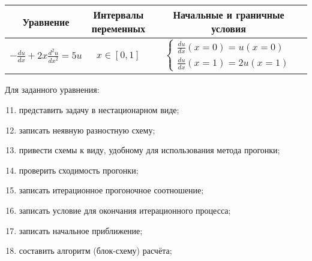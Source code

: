\documentclass[12pt, a4paper]{report}
\begin{document}
	\begin{center}
		\begin{tabular}{||c|c|c||}
			\hline
			Уравнение & \makecell{Интервалы \\ переменных} & Начальные и граничные условия \\

			\hline
			\small 
			$ -\frac{du}{dx} + 2x\frac{d^{2}u}{dx^{2}} = 5u $ & $ x \in [0, 1] $ & $\begin{cases} \frac{du}{dx}(x = 0) = u(x = 0) \\ \frac{du}{dx}(x = 1) = 2u(x = 1) \end{cases}$ \\

			\hline
		\end{tabular}
	\end{center}
	\par
	Для заданного уравнения:
	\begin{enumerate}
		\setcounter{enumi}{10}
		\item представить задачу в нестационарном виде;
		\item записать неявную разностную схему;
		\item привести схемы к виду, удобному для использования метода прогонки;
		\item проверить сходимость прогонки;
		\item записать итерационное прогоночное соотношение;
		\item записать условие для окончания итерационного процесса;
		\item записать начальное приближение;
		\item составить алгоритм (блок-схему) расчёта;
	\end{enumerate}
\end{document}

